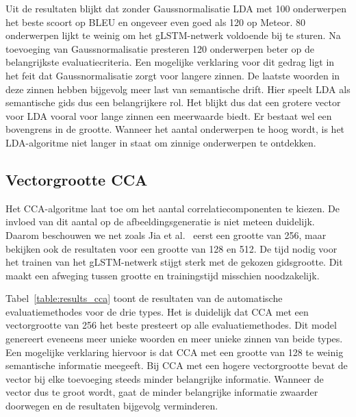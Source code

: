 Uit de resultaten blijkt dat zonder Gaussnormalisatie LDA met 100 onderwerpen het beste scoort op BLEU en ongeveer even goed als 120 op Meteor. 80 onderwerpen lijkt te weinig om het gLSTM-netwerk voldoende bij te sturen. Na toevoeging van Gaussnormalisatie presteren 120 onderwerpen beter op de belangrijkste evaluatiecriteria. Een mogelijke verklaring voor dit gedrag ligt in het feit dat Gaussnormalisatie zorgt voor langere zinnen. De laatste woorden in deze zinnen hebben bijgevolg meer last van semantische drift. Hier speelt LDA als semantische gids dus een belangrijkere rol. Het blijkt dus dat een grotere vector voor LDA vooral voor lange zinnen een meerwaarde biedt. Er bestaat wel een bovengrens in de grootte. Wanneer het aantal onderwerpen te hoog wordt, is het LDA-algoritme niet langer in staat om zinnige onderwerpen te ontdekken.

\subsection{Vectorgrootte CCA} 
Het CCA-algoritme laat toe om het aantal correlatiecomponenten te kiezen. De invloed van dit aantal op de afbeeldingsgeneratie is niet meteen duidelijk. Daarom beschouwen we net zoals Jia et al.~\cite{Fernando2015} eerst een grootte van 256, maar bekijken ook de resultaten voor een grootte van 128 en 512. De tijd nodig voor het trainen van het gLSTM-netwerk stijgt sterk met de gekozen gidsgrootte. Dit maakt een afweging tussen grootte en trainingstijd misschien noodzakelijk.

Tabel~\ref{table:results_cca} toont de resultaten van de automatische evaluatiemethodes voor de drie types. Het is duidelijk dat CCA met een vectorgrootte van 256 het beste presteert op alle evaluatiemethodes. Dit model genereert eveneens meer unieke woorden en meer unieke zinnen van beide types. Een mogelijke verklaring hiervoor is dat CCA met een grootte van 128 te weinig semantische informatie meegeeft. Bij CCA met een hogere vectorgrootte bevat de vector bij elke toevoeging steeds minder belangrijke informatie. Wanneer de vector dus te groot wordt, gaat de minder belangrijke informatie zwaarder doorwegen en de resultaten bijgevolg verminderen.

